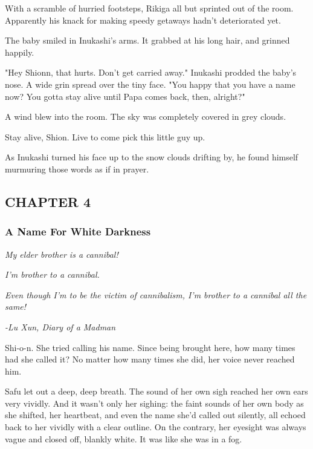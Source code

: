 With a scramble of hurried footsteps, Rikiga all but sprinted out of the
room. Apparently his knack for making speedy getaways hadn't
deteriorated yet.

The baby smiled in Inukashi's arms. It grabbed at his long hair, and
grinned happily.

"Hey Shionn, that hurts. Don't get carried away." Inukashi prodded the
baby's nose. A wide grin spread over the tiny face. "You happy that you
have a name now? You gotta stay alive until Papa comes back, then,
alright?"

A wind blew into the room. The sky was completely covered in grey
clouds.

Stay alive, Shion. Live to come pick this little guy up.

As Inukashi turned his face up to the snow clouds drifting by, he found
himself murmuring those words as if in prayer.

\hypertarget{index_split_065.htmlux5cux23calibre_pb_110}{}

\protect\hypertarget{index_split_108.html}{}{}

\hypertarget{index_split_108.htmlux5cux23calibre_pb_0}{}

\hypertarget{index_split_108.htmlux5cux23calibre_toc_5}{%
\subsection{CHAPTER 4}\label{index_split_108.htmlux5cux23calibre_toc_5}}

\subsubsection{A Name For White Darkness}

\emph{My elder brother is a cannibal!}

\emph{I'm brother to a cannibal.}

\emph{Even though I'm to be the victim of cannibalism, I'm brother to a
cannibal all the same!}

\emph{-Lu Xun, Diary of a Madman}

Shi-o-n. She tried calling his name. Since being brought here, how many
times had she called it? No matter how many times she did, her voice
never reached him.~

Safu let out a deep, deep breath. The sound of her own sigh reached her
own ears very vividly. And it wasn't only her sighing: the faint sounds
of her own body as she shifted, her heartbeat, and even the name she'd
called out silently, all echoed back to her vividly with a clear
outline. On the contrary, her eyesight was always vague and closed off,
blankly white. It was like she was in a fog.

